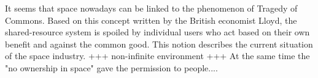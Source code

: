 It seems that space nowadays can be linked to the phenomenon of Tragedy of Commons. Based on this concept written by the British economist Lloyd, the shared-resource system is spoiled by individual users who act based on their own benefit and against the common good. This notion describes the current situation of the space industry. +++ non-infinite environment +++ At the same time the "no ownership in space" gave the permission to people....





